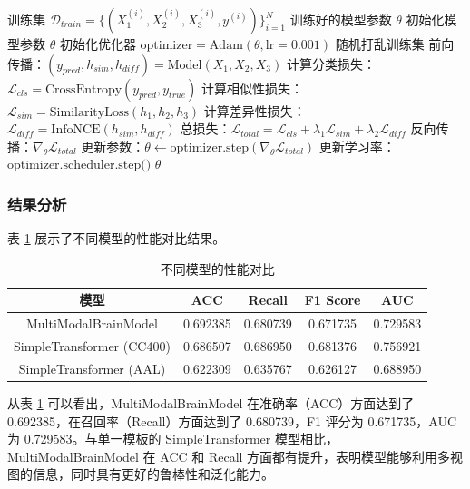 \documentclass[12pt,a4paper]{article}
\begin{document}
\begin{algorithm}[H]
\caption{MultiModalBrainModel 训练过程}
\begin{algorithmic}[1]
\REQUIRE 训练集 $\mathcal{D}_{train} = \{(X_1^{(i)}, X_2^{(i)}, X_3^{(i)}, y^{(i)})\}_{i=1}^{N}$
\ENSURE 训练好的模型参数 $\theta$
\STATE 初始化模型参数 $\theta$
\STATE 初始化优化器 $\text{optimizer} = \text{Adam}(\theta, \text{lr}=0.001)$
    \STATE 随机打乱训练集
        \STATE 前向传播：$(y_{pred}, h_{sim}, h_{diff}) = \text{Model}(X_1, X_2, X_3)$
        \STATE 计算分类损失：$\mathcal{L}_{cls} = \text{CrossEntropy}(y_{pred}, y_{true})$
        \STATE 计算相似性损失：$\mathcal{L}_{sim} = \text{SimilarityLoss}(h_1, h_2, h_3)$
        \STATE 计算差异性损失：$\mathcal{L}_{diff} = \text{InfoNCE}(h_{sim}, h_{diff})$
        \STATE 总损失：$\mathcal{L}_{total} = \mathcal{L}_{cls} + \lambda_1 \mathcal{L}_{sim} + \lambda_2 \mathcal{L}_{diff}$
        \STATE 反向传播：$\nabla_\theta \mathcal{L}_{total}$
        \STATE 更新参数：$\theta \leftarrow \text{optimizer.step}(\nabla_\theta \mathcal{L}_{total})$
    \ENDFOR
    \STATE 更新学习率：$\text{optimizer.scheduler.step()}$
\ENDFOR
\RETURN $\theta$
\end{algorithmic}
\end{algorithm}

\subsubsection{结果分析}

表 \ref{tab:results} 展示了不同模型的性能对比结果。

\begin{table}[H]
\centering
\caption{不同模型的性能对比}
\label{tab:results}
\begin{tabular}{ccccc}
\toprule
模型 & ACC & Recall & F1 Score & AUC \\
\midrule
MultiModalBrainModel & 0.692385 & 0.680739 & 0.671735 & 0.729583 \\
SimpleTransformer (CC400) & 0.686507 & 0.686950 & 0.681376 & 0.756921 \\
SimpleTransformer (AAL) & 0.622309 & 0.635767 & 0.626127 & 0.688950 \\
\bottomrule
\end{tabular}
\end{table}

从表 \ref{tab:results} 可以看出，MultiModalBrainModel 在准确率（ACC）方面达到了 0.692385，在召回率（Recall）方面达到了 0.680739，F1 评分为 0.671735，AUC 为 0.729583。与单一模板的 SimpleTransformer 模型相比，MultiModalBrainModel 在 ACC 和 Recall 方面都有提升，表明模型能够利用多视图的信息，同时具有更好的鲁棒性和泛化能力。
\end{document}
